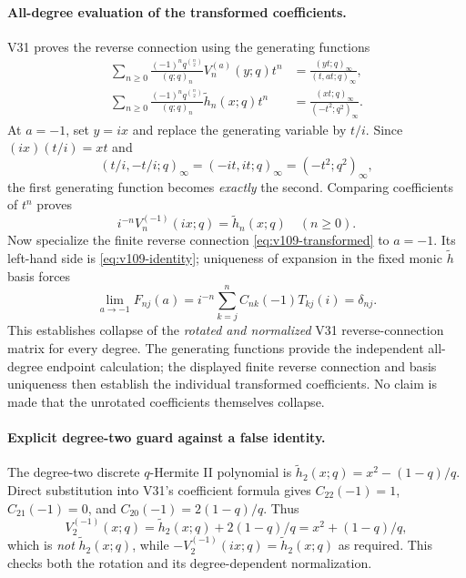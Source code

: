 \documentclass[11pt]{article}
\begin{document}
\paragraph{All-degree evaluation of the transformed coefficients.}
V31 proves the reverse connection using the generating functions
\begin{align*}
\sum_{n\ge0}\frac{(-1)^nq^{\binom n2}}{(q;q)_n}V_n^{(a)}(y;q)t^n
 &=\frac{(yt;q)_\infty}{(t,at;q)_\infty},\\
\sum_{n\ge0}\frac{(-1)^nq^{\binom n2}}{(q;q)_n}\widetilde h_n(x;q)t^n
 &=\frac{(xt;q)_\infty}{(-t^2;q^2)_\infty}.
\end{align*}
At $a=-1$, set $y=ix$ and replace the generating variable by $t/i$. Since $(ix)(t/i)=xt$ and
\[
 (t/i,-t/i;q)_\infty=(-it,it;q)_\infty=(-t^2;q^2)_\infty,
\]
the first generating function becomes \emph{exactly} the second. Comparing coefficients of $t^n$ proves
\begin{equation}\label{eq:v109-identity}
 i^{-n}V_n^{(-1)}(ix;q)=\widetilde h_n(x;q)\quad(n\ge0).
\end{equation}
Now specialize the finite reverse connection \eqref{eq:v109-transformed} to $a=-1$. Its left-hand side is \eqref{eq:v109-identity}; uniqueness of expansion in the fixed monic $\widetilde h$ basis forces
\begin{equation}\label{eq:v109-collapse}
 \boxed{\lim_{a\to-1}F_{nj}(a)=i^{-n}\sum_{k=j}^n C_{nk}(-1)T_{kj}(i)=\delta_{nj}.}
\end{equation}
This establishes collapse of the \emph{rotated and normalized} V31 reverse-connection matrix for every degree. The generating functions provide the independent all-degree endpoint calculation; the displayed finite reverse connection and basis uniqueness then establish the individual transformed coefficients. No claim is made that the unrotated coefficients themselves collapse.

\paragraph{Explicit degree-two guard against a false identity.}
The degree-two discrete $q$-Hermite II polynomial is
$\widetilde h_2(x;q)=x^2-(1-q)/q$. Direct substitution into V31's coefficient formula gives
$C_{22}(-1)=1$, $C_{21}(-1)=0$, and $C_{20}(-1)=2(1-q)/q$. Thus
\[
 V_2^{(-1)}(x;q)=\widetilde h_2(x;q)+2(1-q)/q=x^2+(1-q)/q,
\]
which is \emph{not} $\widetilde h_2(x;q)$, while
$-V_2^{(-1)}(ix;q)=\widetilde h_2(x;q)$ as required. This checks both the rotation and its degree-dependent normalization.
\end{document}
